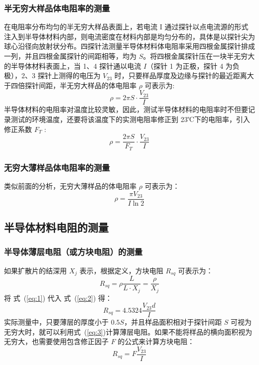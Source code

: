 \documentclass[a4paper,utf8]{article}
\newcommand{\seqref}[1]{式~(\ref{#1})}
\begin{document}
        \subsubsection{半无穷大样品体电阻率的测量}
            在电阻率分布均匀的半无穷大样品表面上，若电流 I 通过探针以点电流源的形式注入到半导体材料内部，则电流密度在材料内部是均匀分布的，具体是以探针尖为球心沿径向放射状分布。四探针法测量半导体材料体电阻率采用四根金属探针排成一列，并且四根金属探针的间距相等，均为 $S$。将四根金属探针压在一块半无穷大的半导体材料表面上，当 1、4 探针通以电流 $I$（探针 1 为正极，探针 4 为负极），2、3 探针上测得的电压为 $V_{23}$ 时，只要样品厚度及边缘与探针的最近距离大于四倍探针间距，半无穷大样品的体电阻率 $\rho$ 可表示为:
            \begin{equation}
                \rho = 2\pi S\cdot\frac{V_{23}}{I} \label{eq:0}
            \end{equation} 
            半导体材料的电阻率对温度比较灵敏，因此，测试半导体材料的电阻率时不但要记录测试的环境温度，还要将该温度下的实测电阻率修正到 23℃下的电阻率，引入修正系数 $F_T$ : 
            \begin{equation}
                \rho =\frac{2\pi S}{F_T}\cdot\frac{V_{23}}{I}
            \end{equation}
        \subsubsection{无穷大薄样品体电阻率的测量}
            类似前面的分析，无穷大薄样品的体电阻率 $\rho$ 可表示为：
            \begin{equation}
                \rho =\frac{\pi V_{23}}{I \ln 2} \label{eq:1}
            \end{equation}
    \subsection{半导体材料电阻的测量}        
        \subsubsection{半导体薄层电阻（或方块电阻）的测量}
            如果扩散片的结深用 $X_j$ 表示，根据定义，方块电阻 $R_{sq}$ 可表示为：
            \begin{equation}
                R_{sq}=\rho\frac{L}{L\cdot X_{j}}=\frac{\rho}{X_{j}} \label{eq:2}
            \end{equation}
            将 \seqref{eq:1} 代入 \seqref{eq:2} 得：
            \begin{equation}
                R_{sq}=4.5324\frac{V_{23} d}{I} \label{eq:3}
            \end{equation}
            实际测量中，只要薄层的厚度小于 $0.5S$，并且样品面积相对于探针间距 $S$ 可视为无穷大时，就可以利用\seqref{eq:3}计算薄层电阻。如果不能将样品的横向面积视为无穷大，也需要使用包含修正因子 $F$ 的公式来计算方块电阻：
            \begin{equation}
                R_{sq}= F \frac{V_{23}}{I} \label{eq:4}
            \end{equation}
        
\end{document}
